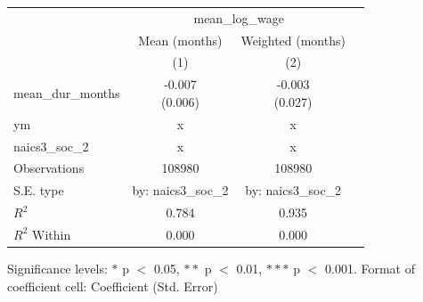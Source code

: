 \renewcommand\cellalign{t}
\begin{threeparttable}
\begin{tabular}{lccc}
\toprule
 & \multicolumn{2}{c}{mean_log_wage} \\
\cmidrule(lr){2-3} 
 & Mean (months) & Weighted (months) \\
 & (1) & (2) \\
\midrule
\addlinespace
mean_dur_months & \makecell{-0.007 \\ (0.006)} & \makecell{-0.003 \\ (0.027)} \\
\midrule
\addlinespace
ym & x & x \\
naics3_soc_2 & x & x \\
\midrule
\addlinespace
Observations & 108980 & 108980 \\
S.E. type & by: naics3_soc_2 & by: naics3_soc_2 \\
$R^2$ & 0.784 & 0.935 \\
$R^2$ Within & 0.000 & 0.000 \\
\bottomrule
\end{tabular}
\footnotesize Significance levels: $*$ p $<$ 0.05, $**$ p $<$ 0.01, $***$ p $<$ 0.001. Format of coefficient cell: Coefficient 
 (Std. Error)
\end{threeparttable}